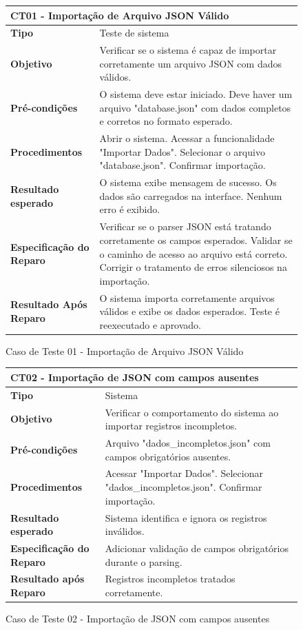 \begin{figure}[H]
    \centering
\begin{longtable}{|p{}|p{}|}
\hline
\multicolumn{2}{|l|}{\textbf{CT01 - Importação de Arquivo JSON Válido}} \\
\hline
\textbf{Tipo} & Teste de sistema \\
\hline
\textbf{Objetivo} & Verificar se o sistema é capaz de importar corretamente um arquivo JSON com dados válidos. \\
\hline
\textbf{Pré-condições} & O sistema deve estar iniciado. Deve haver um arquivo "database.json" com dados completos e corretos no formato esperado.  \\
\hline
\textbf{Procedimentos} & Abrir o sistema. Acessar a funcionalidade "Importar Dados". Selecionar o arquivo "database.json". Confirmar importação. \\
\hline
\textbf{Resultado esperado} & O sistema exibe mensagem de sucesso. Os dados são carregados na interface. Nenhum erro é exibido. \\
\hline
\textbf{Especificação do Reparo} & Verificar se o parser JSON está tratando corretamente os campos esperados. Validar se o caminho de acesso ao arquivo está correto. Corrigir o tratamento de erros silenciosos na importação. \\
\hline
\textbf{Resultado Após Reparo} & O sistema importa corretamente arquivos válidos e exibe os dados esperados. Teste é reexecutado e aprovado. \\
\hline
\end{longtable}
\caption{Caso de Teste 01 - Importação de Arquivo JSON Válido}
\label{fig_ct01_importacao_json_valido}
\end{figure}

\begin{figure}[H]
    \centering
\begin{longtable}{|p{}|p{}|}
\hline
\multicolumn{2}{|l|}{\textbf{CT02 - Importação de JSON com campos ausentes}} \\
\hline
\textbf{Tipo} & Sistema \\
\hline
\textbf{Objetivo} & Verificar o comportamento do sistema ao importar registros incompletos. \\
\hline
\textbf{Pré-condições} & Arquivo "dados\_incompletos.json" com campos obrigatórios ausentes. \\
\hline
\textbf{Procedimentos} & Acessar "Importar Dados". Selecionar "dados\_incompletos.json". Confirmar importação. \\
\hline
\textbf{Resultado esperado} & Sistema identifica e ignora os registros inválidos. \\
\hline
\textbf{Especificação do Reparo} & Adicionar validação de campos obrigatórios durante o parsing. \\
\hline
\textbf{Resultado após Reparo} & Registros incompletos tratados corretamente. \\
\hline
\end{longtable}
\caption{Caso de Teste 02 - Importação de JSON com campos ausentes}
\label{fig_ct02_importacao_json_campos_ausentes}
\end{figure}

